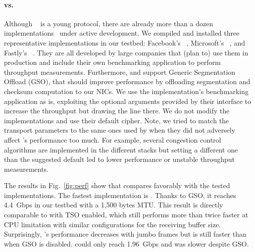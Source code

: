 \paragraph{\tcpls vs. \quic}
Although \quic~\cite{draft-ietf-quic-transport} is a young protocol, there are
already more than a dozen implementations~\cite{marx2020same,quicimplem,yang2020making} under active
development. We compiled and installed three representative \quic implementations in our testbed: Facebook's \mvfst~\cite{mvfst-github,Joras_mvfst}, Microsoft's \msquic~\cite{msquic-github}, and Fastly's
\quicly~\cite{quicly-github}. They are all developed by large companies that (plan to) use them in production and include their own benchmarking application to perform throughput measurements. Furthermore, \mvfst and \quicly support Generic Segmentation Offload (GSO), that should improve performance by offloading \udp segmentation and checksum computation to our NICs. We use the
implementation's benchmarking application as is, exploiting the optional
arguments provided by their interface to increase the throughput but drawing the
line there. We do not modify the \quic implementations and use their default
cipher. Note, we tried to match the transport parameters to the same ones
used by \tcpls when they did not adversely affect \quic's performance too much. For example, several congestion control algorithms are implemented in the different \quic stacks but setting a different one than the suggested default led to lower performance or unstable throughput measurements.

The results in Fig.~\ref{fig:perf} show that \tcpls compares favorably
with the tested \quic implementations. The fastest \quic implementation is
\quicly. Thanks to GSO, it reaches 4.4~Gbps in our testbed with a 1,500 bytes
MTU. This result is directly comparable to \tcpls with TSO enabled, which still
performs more than twice faster at CPU limitation with similar configurations
for the receiving buffer size. Surprisingly, \quicly's performance decreases with
jumbo frames but is still faster than when GSO is disabled.
\msquic could only reach 1.96~Gbps and \mvfst was slower despite GSO.




